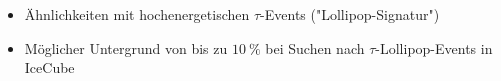 \documentclass[aspectratio=1610, captions=tableheading, 11pt]{beamer}
\begin{document}
\begin{frame}
\begin{columns}
    \begin{itemize}
      \item Ähnlichkeiten mit hochenergetischen $\tau$-Events ("Lollipop-Signatur")
      \item Möglicher Untergrund von bis zu $\SI{10}{\percent}$ bei Suchen nach $\tau$-Lollipop-Events in IceCube\footnotemark
    \end{itemize}
  \end{columns}
\end{frame}



\section{}
\end{document}
